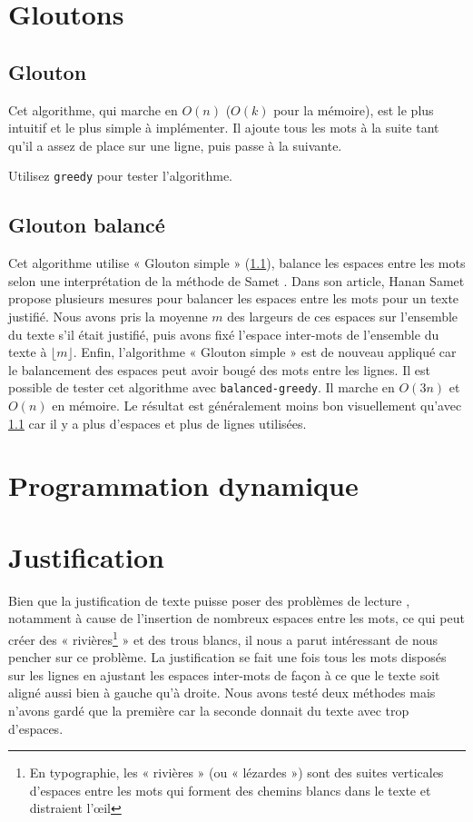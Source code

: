 \documentclass[a4paper, 11pt]{article}
\begin{document}
\section{Gloutons}

\subsection{Glouton}
\label{sec:simple-greedy}

Cet algorithme, qui marche en $O(n)$ ($O(k)$ pour la mémoire), est le plus
intuitif et le plus simple à implémenter. Il ajoute tous les mots à la suite
tant qu'il a assez de place sur une ligne, puis passe à la suivante.

Utilisez \verb|greedy| pour tester l’algorithme.

\subsection{Glouton balancé}
\label{sec:balanced-greedy}

Cet algorithme utilise « Glouton simple » (\ref{sec:simple-greedy}), balance les
espaces entre les mots selon une interprétation de la méthode de Samet
\cite{Samet82}. Dans son article, Hanan Samet propose plusieurs mesures pour
balancer les espaces entre les mots pour un texte justifié. Nous avons pris la
moyenne $m$ des largeurs de ces espaces sur l'ensemble du texte s'il était
justifié, puis avons fixé l'espace inter-mots de l'ensemble du texte à
$\lfloor m \rfloor$. Enfin, l'algorithme « Glouton simple » est de nouveau
appliqué car le balancement des espaces peut avoir bougé des mots entre les
lignes. Il est possible de tester cet algorithme avec \verb|balanced-greedy|. Il
marche en $O(3n)$ et $O(n)$ en mémoire. Le résultat est généralement moins bon
visuellement qu'avec \ref{sec:simple-greedy} car il y a plus d'espaces et plus
de lignes utilisées.

\section{Programmation dynamique}



\section{Justification}
\label{sec:justification}

Bien que la justification de texte puisse poser des problèmes de lecture
\cite{Van96cognitive}, notamment à cause de l'insertion de nombreux espaces
entre les mots, ce qui peut créer des « rivières\footnote{En typographie, les
« rivières » (ou « lézardes ») sont des suites verticales d'espaces entre les
mots qui forment des chemins blancs dans le texte et distraient
l'œil\cite{Harkins12fr}} » et des trous blancs, il nous a parut intéressant de
nous pencher sur ce problème. La justification se fait une fois tous les mots
disposés sur les lignes en ajustant les espaces inter-mots de façon à ce que le
texte soit aligné aussi bien à gauche qu'à droite. Nous avons testé deux
méthodes mais n'avons gardé que la première car la seconde donnait du texte avec
trop d'espaces.
\end{document}
